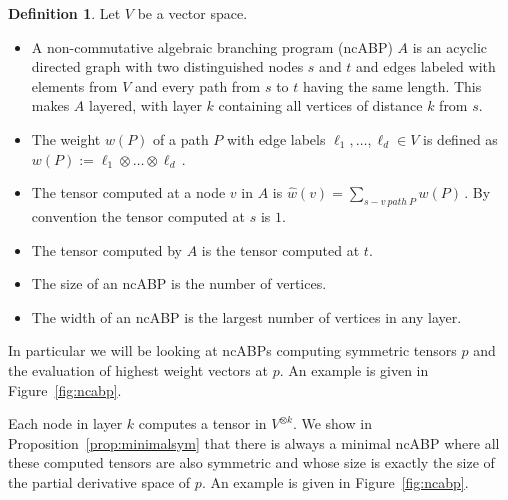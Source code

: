 \documentclass[10pt,a4paper]{article}
\numberwithin{equation}{section}
\theoremstyle{definition}
\newtheorem{definition}[equation]{Definition}
\begin{document}
\begin{definition}\label{def:ncabp}
    Let $V$ be a vector space.
    \begin{itemize}
        \item
            A non-commutative algebraic branching program (ncABP) $A$ is an acyclic directed graph with two distinguished nodes $s$ and $t$ and edges labeled with elements from $V$ and every path from $s$ to $t$ having the same length.
            This makes $A$ layered, with layer $k$ containing all vertices of distance $k$ from $s$.
        \item
            The weight $w(P)$ of a path $P$ with edge labels $\ell_1, \ldots, \ell_d \in V$ is defined as
            $
                w(P) := \ell_1 \otimes \dots \otimes \ell_d\,.
            $
        \item
            The tensor computed at a node $v$ in $A$ is
            $
                \hat{w}(v) = \sum_{s-v\ path\ P}w(P)\,.
            $
            By convention the tensor computed at $s$ is $1$.
        \item
            The tensor computed by $A$ is the tensor computed at $t$.
        \item
            The size of an ncABP is the number of vertices.
        \item
            The width of an ncABP is the largest number of vertices in any layer.
    \end{itemize}
\end{definition}
In particular we will be looking at ncABPs computing symmetric tensors $p$ and the evaluation of highest weight vectors at $p$.
An example is given in Figure~\ref{fig:ncabp}.

Each node in layer $k$ computes a tensor in $V^{\otimes k}$.
We show in Proposition~\ref{prop:minimalsym} that there is always a minimal ncABP where all these computed tensors are also symmetric and whose size is exactly the size of the partial derivative space of $p$.
An example is given in Figure~\ref{fig:ncabp}.
\end{document}
